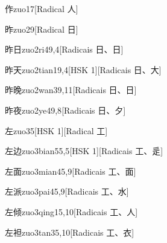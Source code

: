 \begin{entry}{作}{zuo1}{7}[Radical ⼈]
\end{entry}

\begin{entry}{昨}{zuo2}{9}[Radical ⽇]
\end{entry}

\begin{entry}{昨日}{zuo2ri4}{9,4}[Radicais ⽇、⽇]
\end{entry}

\begin{entry}{昨天}{zuo2tian1}{9,4}[HSK 1][Radicais ⽇、⼤]
\end{entry}

\begin{entry}{昨晚}{zuo2wan3}{9,11}[Radicais ⽇、⽇]
\end{entry}

\begin{entry}{昨夜}{zuo2ye4}{9,8}[Radicais ⽇、⼣]
\end{entry}

\begin{entry}{左}{zuo3}{5}[HSK 1][Radical ⼯]
\end{entry}

\begin{entry}{左边}{zuo3bian5}{5,5}[HSK 1][Radicais ⼯、⾡]
\end{entry}

\begin{entry}{左面}{zuo3mian4}{5,9}[Radicais ⼯、⾯]
\end{entry}

\begin{entry}{左派}{zuo3pai4}{5,9}[Radicais ⼯、⽔]
\end{entry}

\begin{entry}{左倾}{zuo3qing1}{5,10}[Radicais ⼯、⼈]
\end{entry}

\begin{entry}{左袒}{zuo3tan3}{5,10}[Radicais ⼯、⾐]
\end{entry}

